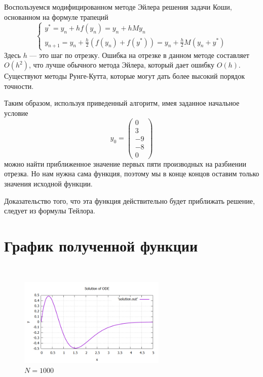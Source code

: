 \documentclass{article}
\newcounter{vopros}
\newcounter{th-counter}[vopros]
\begin{document}
Воспользуемся модифицированном методе Эйлера решения задачи Коши, основанном на формуле трапеций
$$
\begin{cases}
    y^*=y_n + h f(y_n) = y_n + h My_n\\
    y_{n+1} = y_n + \frac{h}{2} (f(y_n) + f(y^*)) = y_n + \frac{h}{2} M(y_n + y^*)
\end{cases}
$$
Здесь $h$ --- это шаг по отрезку. Ошибка на отрезке в данном методе составляет $O(h^2)$, что лучше обычного метода Эйлера, который дает ошибку $O(h)$. Существуют методы Рунге-Кутта, которые могут дать более высокий порядок точности.

Таким образом, используя приведенный алгоритм, имея заданное начальное условие
$$y_0 = 
\begin{pmatrix}
    0\\
    3\\
    -9\\
    -8\\
    0
\end{pmatrix}
$$
можно найти приближенное значение первых пяти производных на разбиении отрезка. Но нам нужна сама функция, поэтому мы в конце концов оставим только значения исходной функции. 

Доказательство того, что эта функция действительно будет приближать решение, следует из формулы Тейлора.

\newpage
\section{График полученной функции}
\
\begin{figure}[h]
    \centering
	\includegraphics[width = 7cm]{result.png}
	\caption{$N = 1000$}
\end{figure}
\end{document}
